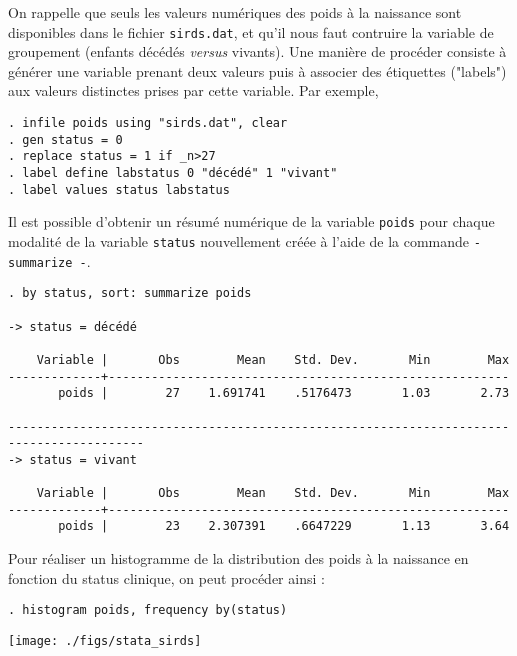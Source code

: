\soln{\ref{exo:9.1}} On rappelle que seuls les valeurs numériques des poids
à la naissance sont disponibles dans le fichier \texttt{sirds.dat}, et qu'il
nous faut contruire la variable de groupement (enfants décédés \emph{versus}
vivants). Une manière de procéder consiste à générer une variable prenant
deux valeurs puis à associer des étiquettes ("labels") aux valeurs
distinctes prises par cette variable. Par exemple,
\begin{verbatim}
. infile poids using "sirds.dat", clear
. gen status = 0
. replace status = 1 if _n>27
. label define labstatus 0 "décédé" 1 "vivant"
. label values status labstatus
\end{verbatim}

Il est possible d'obtenir un résumé numérique de la variable \texttt{poids}
pour chaque modalité de la variable \texttt{status} nouvellement créée à
l'aide de la commande \verb|- summarize -|.
\begin{verbatim}
. by status, sort: summarize poids

-> status = décédé

    Variable |       Obs        Mean    Std. Dev.       Min        Max
-------------+--------------------------------------------------------
       poids |        27    1.691741    .5176473       1.03       2.73

-----------------------------------------------------------------------------------------
-> status = vivant

    Variable |       Obs        Mean    Std. Dev.       Min        Max
-------------+--------------------------------------------------------
       poids |        23    2.307391    .6647229       1.13       3.64
\end{verbatim}

Pour réaliser un histogramme de la distribution des poids à la naissance en
fonction du status clinique, on peut procéder ainsi :
\begin{verbatim}
. histogram poids, frequency by(status)
\end{verbatim}
\texttt{[image: ./figs/stata\_sirds]}

